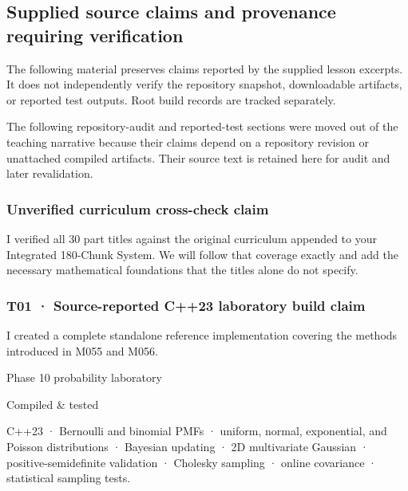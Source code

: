 \subsection{Supplied source claims and provenance requiring verification}\label{02-foundations-ii-ch039-supplied-source-claims-and-provenance-requiring-verification}

\hypertarget{02-foundations-ii-ch039-supplied-source-claims-and-provenance-requiring-verification}{}

The following material preserves claims reported by the supplied lesson excerpts. It does not independently verify the repository snapshot, downloadable artifacts, or reported test outputs. Root build records are tracked separately.

The following repository-audit and reported-test sections were moved out of the teaching narrative because their claims depend on a repository revision or unattached compiled artifacts. Their source text is retained here for audit and later revalidation.

\subsubsection{Unverified curriculum cross-check claim}\label{02-foundations-ii-ch039-unverified-curriculum-cross-check-claim}

\hypertarget{02-foundations-ii-ch039-unverified-curriculum-cross-check-claim}{}

I verified all 30 part titles against the original curriculum appended to your Integrated 180-Chunk System. We will follow that coverage exactly and add the necessary mathematical foundations that the titles alone do not specify.

\subsubsection{T01 · Source-reported C++23 laboratory build claim}\label{02-foundations-ii-ch039-t01-source-reported-c23-laboratory-build-claim}

\hypertarget{02-foundations-ii-ch039-t01-source-reported-c23-laboratory-build-claim}{}

I created a complete standalone reference implementation covering the methods introduced in M055 and M056.

Phase 10 probability laboratory

Compiled \& tested

C++23 · Bernoulli and binomial PMFs · uniform, normal, exponential, and Poisson distributions · Bayesian updating · 2D multivariate Gaussian · positive-semidefinite validation · Cholesky sampling · online covariance · statistical sampling tests.


